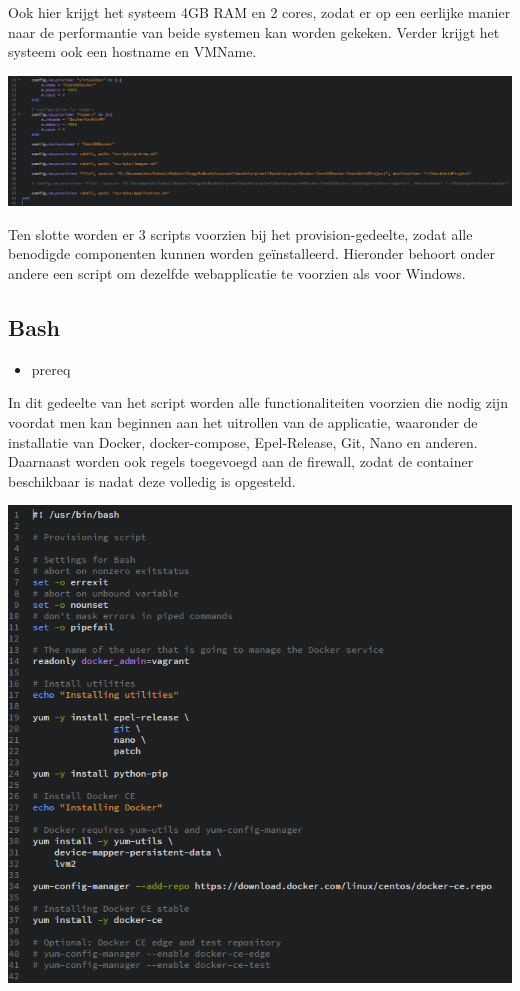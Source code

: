 Ook hier krijgt het systeem 4GB RAM en 2 cores, zodat er op een eerlijke manier naar de performantie van beide systemen kan worden gekeken. Verder krijgt het systeem ook een hostname en VMName.

\begin{center}
	\includegraphics[scale=0.6]{img/centosvagrant02}
\end{center}

Ten slotte worden er 3 scripts voorzien bij het provision-gedeelte, zodat alle benodigde componenten kunnen worden geïnstalleerd. Hieronder behoort onder andere een script om dezelfde webapplicatie te voorzien als voor Windows.

\subsection{Bash}

\begin{itemize}[noitemsep]
	\item prereq
\end{itemize}

In dit gedeelte van het script worden alle functionaliteiten voorzien die nodig zijn voordat men kan beginnen aan het uitrollen van de applicatie, waaronder de installatie van Docker, docker-compose, Epel-Release, Git, Nano en anderen.
Daarnaast worden ook regels toegevoegd aan de firewall, zodat de container beschikbaar is nadat deze volledig is opgesteld.

\begin{center}
	\includegraphics[scale=0.6]{img/centosprereq01}
\end{center}

